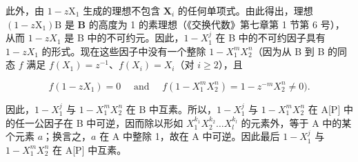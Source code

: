此外，由 \(1 - z\mathrm{X}_1\) 生成的理想不包含 \(\mathbf{X}_i\) 的任何单项式。由此得出，理想 \((1 - z\mathrm{X}_1)\mathrm{B}\) 是 \(\mathbf{B}\) 的高度为 1 的素理想（《交换代数》第七章第 1 节第 6 号），从而 \(1 - zX_{1}\) 是 B 中的不可约元。因此，\(1 - X_{1}^{j}\) 在 B 中的不可约因子具有 \(1 - zX_{1}\) 的形式。现在这些因子中没有一个整除 \(1 - X_{1}^{m}X_{2}^{n}\)（因为从 B 到 B 的同态 \(f\) 满足 \(f(X_{1}) = z^{-1}\)、\(f(X_{i}) = X_{i}\)（对 \(i \geqslant 2\)），且

\[
f (1 - z X _ {1}) = 0 \quad \text { and } \quad f (1 - X _ {1} ^ {m} X _ {2} ^ {n}) = 1 - z ^ {- m} X _ {2} ^ {n} \neq 0).
\]

因此，\(1 - X_1^j\) 与 \(1 - X_1^m X_2^n\) 在 B 中互素。所以，\(1 - X_1^j\) 与 \(1 - X_1^m X_2^n\) 在 A{[}P{]} 中的任一公因子在 B 中可逆，因而除以形如 \(X_1^{k_1}X_2^{k_2}\ldots X_l^{k_l}\) 的元素外，等于 A 中的某个元素 \(a\)；换言之，\(a\) 在 A 中整除 1，故在 A 中可逆。因此最后 \(1 - X_1^j\) 与 \(1 - X_1^m X_2^n\) 在 A{[}P{]} 中互素。

